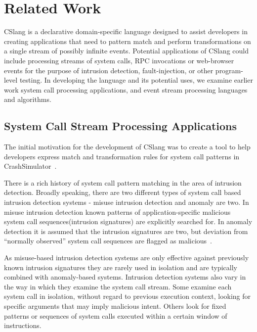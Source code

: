 \section{Related Work}
\label{SEC:related-work}

CSlang is a declarative domain-specific language designed to
assist developers in creating
applications that need to pattern match and perform
transformations on a single stream of possibly infinite events.
Potential applications
of CSlang could include
processing streams of system calls, RPC invocations or
web-browser events for the purpose of intrusion detection, fault-injection, or
other program-level testing.
In developing the language and its potential uses,
we examine
earlier work system call processing applications,
and event stream processing languages and algorithms.

\subsection{System Call Stream Processing Applications}
The
initial motivation for the development of CSlang was to create a tool to help
developers express match and transformation rules for system call patterns in
CrashSimulator~\cite{DBLP:conf/issre/MooreCFW19}.

There is a rich history of system call pattern
matching in the area of intrusion detection.  Broadly speaking, there are two
different types of system call based intrusion detection systems - misuse
intrusion detection and anomaly are two. In misuse intrusion
detection known patterns of application-specific malicious system call
sequences(intrusion signatures) are explicitly searched for. In anomaly
detection it is assumed that the intrusion signatures are two, but deviation
from “normally observed” system call sequences are flagged as
malicious~\cite{DBLP:conf/sp/ForrestHSL96}.

As misuse-based intrusion detection systems are only
effective against previously known intrusion signatures they are rarely used in
isolation and are typically combined with anomaly-based systems.
Intrusion
detection systems also vary in the way in which they examine the system call
stream.
Some examine each system call in isolation,
without regard to previous
execution context,
looking for specific arguments that may imply malicious
intent.
Others look for fixed patterns or sequences of system calls executed
within a certain window of instructions.

